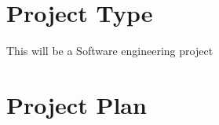 \documentclass[]{article}
\begin{document}
\section{Project Type}
This will be a Software engineering project
\section{Project Plan}
\noindent
{}
{}
\end{document}
